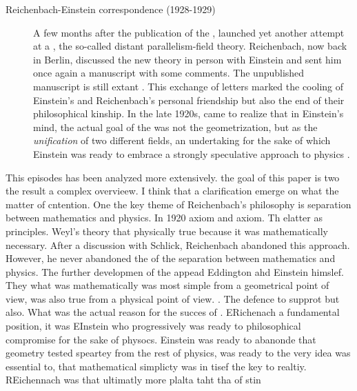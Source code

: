 \documentclass[draft]{article}
\newcommand{\PRZL}{\citetitle{Reichenbach1928}\xspace}
\newcommand{\DP}{distant parallelism\xspace}
\begin{document}
\begin{description}
\item[Reichenbach-Einstein correspondence (1928-1929)]\label{reichenbacheinsteinII}   A few months after the publication of the \PRZL \citep{Reichenbach1928}, \citet{Einstein19281,Einstein19282} launched yet another attempt at a \uft, the so-called \DP-field theory. Reichenbach, now back in Berlin, discussed the new theory in person with Einstein and sent him once again a manuscript with some comments. The unpublished manuscript is still extant \citep{Reichenbach1928b}. This exchange of letters marked the cooling of Einstein's and Reichenbach's personal friendship but also the end of their philosophical kinship. In the late 1920s, \citet{Reichenbach1929a,Reichenbach1929b,Reichenbach1929c} came to realize that in Einstein's mind, the actual goal of the \uftp was not the geometrization, but as the \emph{unification} of two different fields, an undertaking for the sake of which Einstein was ready to embrace a strongly speculative approach to physics \citep{Dongen2010}.  
\end{description}

This episodes has been analyzed more extensively. the goal of this paper is two the result a complex overvieew. I think that a clarification emerge on what the matter of cntention. One the key theme of Reichenbach's philosophy is separation between mathematics and physics. In 1920 axiom and axiom. Th elatter as \apr principles. Weyl's theory that physically true because it was mathematically necessary.   After a discussion with Schlick, Reichenbach abandoned this approach. However, he never abandoned the of the separation between mathematics and physics. The further developmen of the \uftp appead Eddington ahd Einstein himslef. They what was mathematically was most simple from a geometrical point of view, was also true from a physical point of view. .  The defence to supprot \rt but also. What was the actual reason for the succes of \rt. ERichenach a fundamental position, it was EInstein who progressively was ready to philosophical compromise for the sake of physocs. Einstein was ready to abanonde that geometry tested speartey from the rest of physics, was ready to the very idea was essential to, that mathematical simplicty was in tisef the key to realtiy. REichennach was that ultimatly more plalta taht  tha of stin
\end{document}
